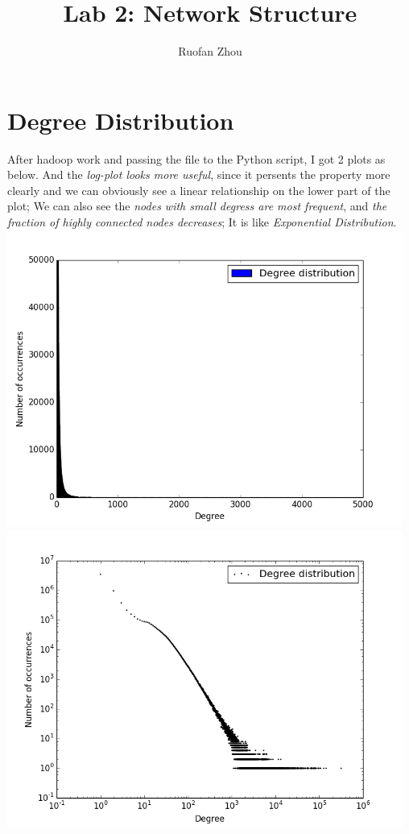 \documentclass[11pt]{article} %
\title{Lab 2: Network Structure}
\author{Ruofan Zhou}
\begin{document}
\maketitle

\section{Degree Distribution}
After hadoop work and passing the file to the Python script, I got 2 plots as below.
\newline
And the \emph{log-plot looks more useful}, since it persents the property more clearly and we can obviously see a linear relationship on the lower part of the plot;
\newline
We can also see the \emph{nodes with small degress are most frequent}, and \emph{the fraction of highly connected nodes decreases};
\newline
It is like \emph{Exponential Distribution}.
\newline
\includegraphics[width=13cm]{pics/degdist-lin}
\\
\includegraphics[width=13cm]{pics/degdist-log}
\end{document}
